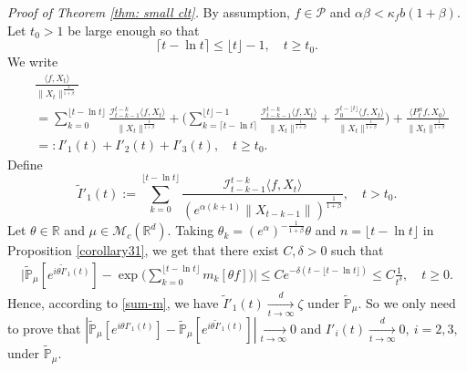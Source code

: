 \documentclass[12pt,a4paper]{amsart}
\theoremstyle{plain}
\theoremstyle{definition}
\numberwithin{equation}{section}
\begin{document}
{\it Proof of Theorem \ref{thm: small clt}.}\quad
    By assumption, $f\in \mathcal P$  and $\alpha \beta < \kappa_f b(1+\beta)$.
	Let $t_0 > 1$ be large enough so that
\[
	\lceil t - \ln t\rceil
	\leq \lfloor t \rfloor - 1,
	\quad t\geq t_0.
\]
	We write
\begin{align*}
	&\frac{\langle f,X_t\rangle}{\|X_t\|^{\frac{1}{1+\beta}}}
	\\&=\sum_{k=0}^{\lfloor t-\ln t \rfloor} \frac{\mathcal I_{t-k-1}^{t-k}\langle f ,X_t\rangle}{\|X_t\|^{\frac{1}{1+\beta}}}+ \Big(\sum_{k=\lceil t-\ln t \rceil}^{\lfloor t \rfloor-1} \frac{\mathcal I_{t-k-1}^{t-k}\langle f ,X_t\rangle}{\|X_t\|^{\frac{1}{1+\beta}}}+\frac{\mathcal I_0^{t-\lfloor t \rfloor}\langle f ,X_t\rangle}{\|X_t\|^{\frac{1}{1+\beta}}}\Big) +
\frac{\langle P^\alpha_t f, X_0\rangle}{\|X_t\|^{\frac{1}{1+\beta}}}
	\\&=:I'_1(t)+I'_2(t)+I'_3(t),
	\quad t\geq t_0.
\end{align*}
	Define
\[
 	\tilde I'_1(t)
 	:=\sum_{k=0}^{\lfloor t-\ln t \rfloor}\frac{\mathcal I_{t-k-1}^{t-k}\langle f ,X_t\rangle}{( e^{\alpha(k+1)}\|X_{t-k-1}\|)^{\frac{1}{1+\beta}}},
 	\quad t > t_0.
\]
    Let $\theta\in \mathbb R$ and $\mu\in \mathcal M_c(\mathbb R^d)$.
    Taking $\theta_k=(e^{\alpha})^{-\frac{1}{1+\beta}} \theta $ and $n={\lfloor t-\ln t \rfloor}$ in Proposition \ref{corollary31},
    we get that there exist $C,\delta > 0$ such that
\begin{align*}
    \Big|\mathbb{\tilde{P}}_{\mu} [e^{i\theta\tilde I'_1(t)} ]-\exp\Big(\sum_{k=0}^{\lfloor t-\ln t \rfloor}m_k[\theta f]\Big)\Big|
    \leq C e^{-\delta(t - \lfloor t - \ln t\rfloor)}
    \leq C \frac{1}{t^{\delta}},
    \quad t\geq 0.
\end{align*}
    Hence, according to \eqref{sum-m}, we have $\tilde I'_1(t)\xrightarrow[t\to \infty]{d} \zeta$ under $\tilde {\mathbb P}_\mu$.
    So we only need to prove that $|\mathbb{\tilde{P}}_{\mu}[e^{i\theta I'_1(t)}]-\mathbb{\tilde{P}}_{\mu}[e^{i\theta\tilde I'_1(t)}]|\xrightarrow[t\to \infty]{} 0$ and $I'_i(t)\xrightarrow[t\to \infty]{d} 0,~i=2,3,$ under $\tilde {\mathbb P}_\mu$.
\end{document}
